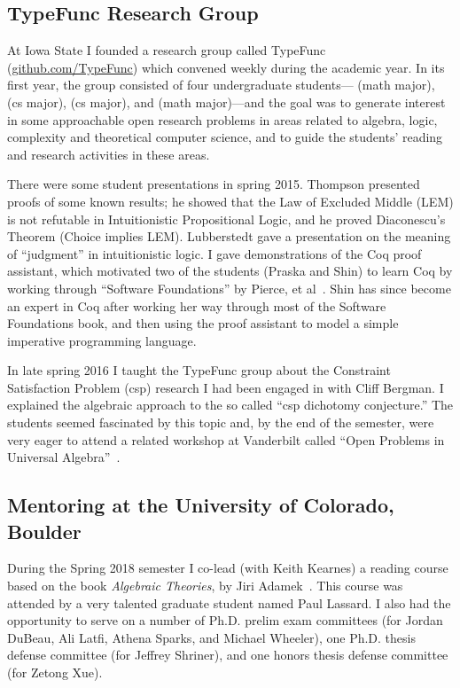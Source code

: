 \bigskip

\subsection{TypeFunc Research Group} \label{sec:typef-rese-group} At Iowa State I founded a research group called TypeFunc (\href{https://github.com/TypeFunc/}{github.com/TypeFunc}) which convened weekly during the academic year.  In its first year, the group consisted of four undergraduate students--- (math major),  (cs major),  (cs major), and  (math major)---and the goal was to generate interest in some approachable open research problems in areas related to algebra, logic, complexity and theoretical computer science, and to guide the students' reading and research activities in these areas.


There were some student presentations in spring 2015. Thompson presented proofs of some known results; he showed that the Law of Excluded Middle (LEM) is not refutable in Intuitionistic Propositional Logic, and he proved Diaconescu's Theorem (Choice implies LEM). Lubberstedt gave a presentation on the meaning of ``judgment'' in intuitionistic logic. I gave demonstrations of the Coq proof assistant, which motivated two of the students (Praska and Shin) to learn Coq by working through ``Software Foundations'' by Pierce, et al~\cite{Pierce:SF}. Shin has since become an expert in Coq after working her way through most of the Software Foundations book, and then using the proof assistant to model a simple imperative programming language.


In late spring 2016 I taught the TypeFunc group about the Constraint Satisfaction Problem (csp) research I had been engaged in with Cliff Bergman. I explained the algebraic approach to the so called ``csp dichotomy conjecture.'' The students seemed fascinated by this topic and, by the end of the semester, were very eager to attend a related workshop at Vanderbilt called ``Open Problems in Universal Algebra''~\cite{Shanks}.

\bigskip

\subsection{Mentoring at the University of Colorado, Boulder} During the Spring 2018 semester I co-lead (with Keith Kearnes) a reading course based on the book \emph{Algebraic Theories}, by Jiri Adamek~\cite{MR2757312}.  This course was attended by a very talented graduate student named Paul Lassard.  I also had the opportunity to serve on a number of Ph.D. prelim exam committees (for Jordan DuBeau, Ali Latfi, Athena Sparks, and Michael Wheeler), one Ph.D. thesis defense committee (for Jeffrey Shriner), and one honors thesis defense committee (for Zetong Xue).

